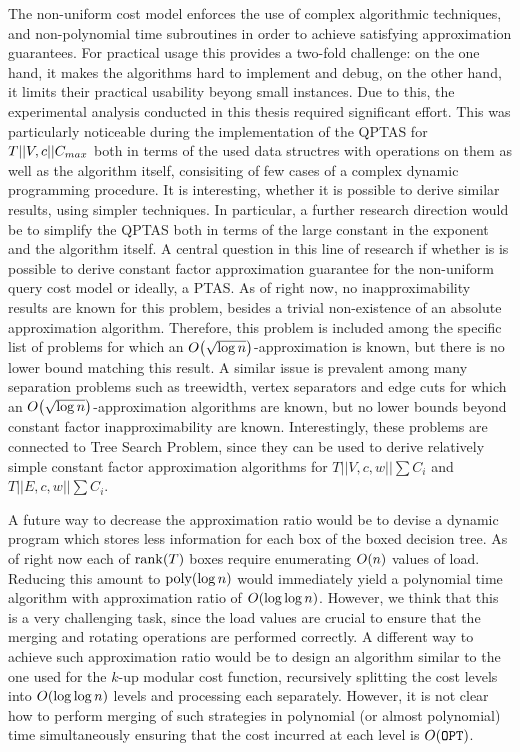 The non-uniform cost model enforces the use of complex algorithmic techniques, and non-polynomial time subroutines in order to achieve satisfying approximation guarantees. For practical usage this provides a two-fold challenge: on the one hand, it makes the algorithms hard to implement and debug, on the other hand, it limits their practical usability beyong small instances. Due to this, the experimental analysis conducted in this thesis required significant effort. This was particularly noticeable during the implementation of the QPTAS for $T||V, c||C_{max}$ both in terms of the used data structres with operations on them as well as the algorithm itself, consisiting of few cases of a complex dynamic programming procedure. It is interesting, whether it is possible to derive similar results, using simpler techniques. In particular, a further research direction would be to simplify the QPTAS both in terms of the large constant in the exponent and the algorithm itself. A central question in this line of research if whether is is possible to derive constant factor approximation guarantee for the non-uniform query cost model or ideally, a PTAS. As of right now, no inapproximability results are known for this problem, besides a trivial non-existence of an absolute approximation algorithm. Therefore, this problem is included among the specific list of problems for which an $O\mathopen{}\left( \sqrt{\log n} \right)$-approximation is known, but there is no lower bound matching this result. A similar issue is prevalent among many separation problems such as treewidth, vertex separators and edge cuts \cite{ExpFsGEandGPart,PartGsintoBComps, Improvedapproximationalgorithmsvertexseparators} for which an $O\mathopen{}\left( \sqrt{\log n} \right)$-approximation algorithms are known, but no lower bounds beyond constant factor inapproximability are known. Interestingly, these problems are connected to Tree Search Problem, since they can be used to derive relatively simple constant factor approximation algorithms for $T||V,c,w||\sum C_i$ and $T||E,c,w||\sum C_i$\cite{szyfelbein2025approximatingaveragecasegraphsearch,Acostfunctionforsimilaritybasedhierarchicalclustering,Approximatehierarchicalclusteringviasparsestcutandspreadingmetrics}.  

A future way to decrease the approximation ratio would be to devise a dynamic program which stores less information for each box of the boxed decision tree. As of right now each of $\operatorname{rank}\mathopen{}\left( T \right)$ boxes require enumerating $O\mathopen{}\left( n \right)$ values of load. Reducing this amount to $\text{poly}\mathopen{}\left( \log n \right)$ would immediately yield a polynomial time algorithm with approximation ratio of $O\mathopen{}\left( \log \log n \right)$. However, we think that this is a very challenging task, since the load values are crucial to ensure that the merging and rotating operations are performed correctly. A different way to achieve such approximation ratio would be to design an algorithm similar to the one used for the $k$-up modular cost function, recursively splitting the cost levels into $O\mathopen{}\left( \log \log n \right)$ levels and processing each separately. However, it is not clear how to perform merging of such strategies in polynomial (or almost polynomial) time simultaneously ensuring that the cost incurred at each level is $O\mathopen{}\left( \texttt{OPT} \right)$.
